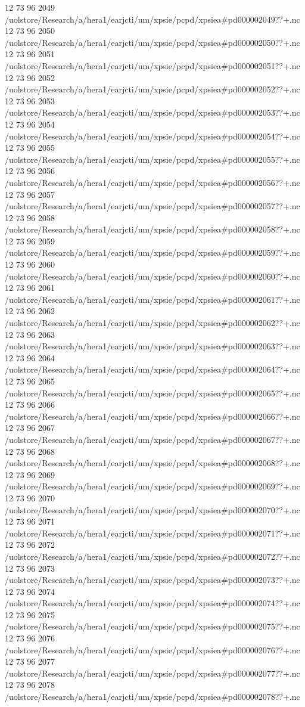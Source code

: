 12 73 96
2049
/uolstore/Research/a/hera1/earjcti/um/xpsie/pcpd/xpsiea#pd000002049??+.nc
12 73 96
2050
/uolstore/Research/a/hera1/earjcti/um/xpsie/pcpd/xpsiea#pd000002050??+.nc
12 73 96
2051
/uolstore/Research/a/hera1/earjcti/um/xpsie/pcpd/xpsiea#pd000002051??+.nc
12 73 96
2052
/uolstore/Research/a/hera1/earjcti/um/xpsie/pcpd/xpsiea#pd000002052??+.nc
12 73 96
2053
/uolstore/Research/a/hera1/earjcti/um/xpsie/pcpd/xpsiea#pd000002053??+.nc
12 73 96
2054
/uolstore/Research/a/hera1/earjcti/um/xpsie/pcpd/xpsiea#pd000002054??+.nc
12 73 96
2055
/uolstore/Research/a/hera1/earjcti/um/xpsie/pcpd/xpsiea#pd000002055??+.nc
12 73 96
2056
/uolstore/Research/a/hera1/earjcti/um/xpsie/pcpd/xpsiea#pd000002056??+.nc
12 73 96
2057
/uolstore/Research/a/hera1/earjcti/um/xpsie/pcpd/xpsiea#pd000002057??+.nc
12 73 96
2058
/uolstore/Research/a/hera1/earjcti/um/xpsie/pcpd/xpsiea#pd000002058??+.nc
12 73 96
2059
/uolstore/Research/a/hera1/earjcti/um/xpsie/pcpd/xpsiea#pd000002059??+.nc
12 73 96
2060
/uolstore/Research/a/hera1/earjcti/um/xpsie/pcpd/xpsiea#pd000002060??+.nc
12 73 96
2061
/uolstore/Research/a/hera1/earjcti/um/xpsie/pcpd/xpsiea#pd000002061??+.nc
12 73 96
2062
/uolstore/Research/a/hera1/earjcti/um/xpsie/pcpd/xpsiea#pd000002062??+.nc
12 73 96
2063
/uolstore/Research/a/hera1/earjcti/um/xpsie/pcpd/xpsiea#pd000002063??+.nc
12 73 96
2064
/uolstore/Research/a/hera1/earjcti/um/xpsie/pcpd/xpsiea#pd000002064??+.nc
12 73 96
2065
/uolstore/Research/a/hera1/earjcti/um/xpsie/pcpd/xpsiea#pd000002065??+.nc
12 73 96
2066
/uolstore/Research/a/hera1/earjcti/um/xpsie/pcpd/xpsiea#pd000002066??+.nc
12 73 96
2067
/uolstore/Research/a/hera1/earjcti/um/xpsie/pcpd/xpsiea#pd000002067??+.nc
12 73 96
2068
/uolstore/Research/a/hera1/earjcti/um/xpsie/pcpd/xpsiea#pd000002068??+.nc
12 73 96
2069
/uolstore/Research/a/hera1/earjcti/um/xpsie/pcpd/xpsiea#pd000002069??+.nc
12 73 96
2070
/uolstore/Research/a/hera1/earjcti/um/xpsie/pcpd/xpsiea#pd000002070??+.nc
12 73 96
2071
/uolstore/Research/a/hera1/earjcti/um/xpsie/pcpd/xpsiea#pd000002071??+.nc
12 73 96
2072
/uolstore/Research/a/hera1/earjcti/um/xpsie/pcpd/xpsiea#pd000002072??+.nc
12 73 96
2073
/uolstore/Research/a/hera1/earjcti/um/xpsie/pcpd/xpsiea#pd000002073??+.nc
12 73 96
2074
/uolstore/Research/a/hera1/earjcti/um/xpsie/pcpd/xpsiea#pd000002074??+.nc
12 73 96
2075
/uolstore/Research/a/hera1/earjcti/um/xpsie/pcpd/xpsiea#pd000002075??+.nc
12 73 96
2076
/uolstore/Research/a/hera1/earjcti/um/xpsie/pcpd/xpsiea#pd000002076??+.nc
12 73 96
2077
/uolstore/Research/a/hera1/earjcti/um/xpsie/pcpd/xpsiea#pd000002077??+.nc
12 73 96
2078
/uolstore/Research/a/hera1/earjcti/um/xpsie/pcpd/xpsiea#pd000002078??+.nc
